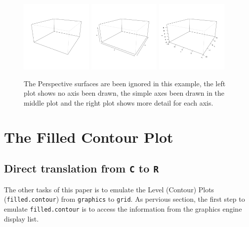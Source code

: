 \documentclass[paper=a4, fontsize=11pt]{report}
\begin{document}
\begin{figure}[h]
\begin{center}
  \includegraphics[height = 3.5cm, width = 3.5cm]{figure/axis_example_1.pdf}
  \includegraphics[height = 3.5cm, width = 3.5cm]{figure/axis_example_2.pdf}
  \includegraphics[height = 3.5cm, width = 3.5cm]{figure/axis_example_3.pdf}
  \caption{The Perspective surfaces are been ignored in this example, the left plot shows no axis been drawn, the simple axes been drawn in the middle plot and the right plot shows more detail for each axis.}
  	\label{figure8}
\end{center}
\end{figure}

\section{The Filled Contour Plot}
\subsection{Direct translation from \texttt{C} to \texttt{R}}
The other tasks of this paper is to emulate the Level (Contour) Plots (\texttt{filled.contour}) from \texttt{graphics} to \texttt{grid}. As pervious section, the first step to emulate \texttt{filled.contour} is to access the information from the graphics engine display list. \\
\end{document}
